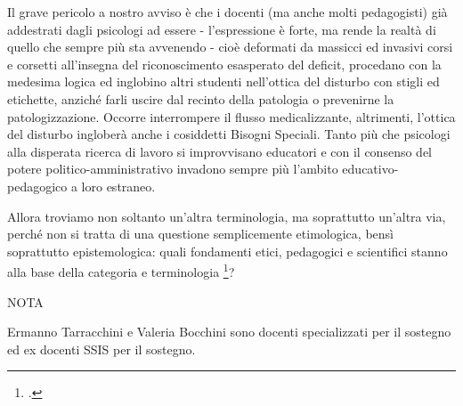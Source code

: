 Il grave pericolo a nostro avviso è che i docenti (ma anche molti pedagogisti) già addestrati dagli psicologi ad essere  - l'espressione è forte, ma rende la realtà di quello che sempre più sta avvenendo - cioè deformati da massicci ed invasivi corsi e corsetti all'insegna del riconoscimento esasperato del deficit, procedano con la medesima logica ed inglobino altri studenti nell'ottica del disturbo con stigli ed etichette, anziché farli uscire dal recinto della patologia o prevenirne la patologizzazione. Occorre interrompere il flusso medicalizzante, altrimenti, l'ottica del disturbo ingloberà anche i cosiddetti Bisogni Speciali. Tanto più che psicologi alla disperata ricerca di lavoro si improvvisano educatori e con il consenso del potere politico-amministrativo invadono sempre più l'ambito educativo-pedagogico a loro estraneo.

Allora troviamo non soltanto un'altra terminologia, ma soprattutto un'altra via, perché non si tratta di una questione semplicemente etimologica, bensì soprattutto epistemologica: quali fondamenti etici, pedagogici e scientifici stanno alla base della categoria e terminologia \footcite{Tarracchini2013}?

NOTA

Ermanno Tarracchini e Valeria Bocchini sono docenti specializzati per il sostegno ed ex docenti SSIS per il sostegno.